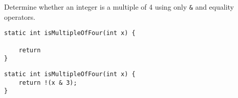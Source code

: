 \question Determine whether an integer is a multiple of 4 using only \texttt{&} and equality operators.

\ifprintanswers\else
\begin{lstlisting}
static int isMultipleOfFour(int x) {

    return
}
\end{lstlisting}
\fi

\begin{solution}
\begin{lstlisting}
static int isMultipleOfFour(int x) {
    return !(x & 3);
}
\end{lstlisting}
\end{solution}